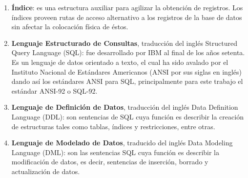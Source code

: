 \begin{enumerate}
	\item \textbf{Índice}: es una estructura auxiliar para agilizar la obtención de registros. Los índices proveen rutas de acceso alternativo a los registros de la base de datos sin afectar la colocación física de éstos\cite{FundamentalsOfDBSystems}.
	\item \textbf{Lenguaje Estructurado de Consultas}, traducción del inglés Structured Query Language (SQL): fue desarrollado por IBM\textsuperscript{\textcopyright} al final de los años setenta. Es un lenguaje de datos orientado a texto, el cual ha sido avalado por el Instituto Nacional de Estándares Americanos (ANSI por sus siglas en inglés) dando así los estándares ANSI para SQL, principalmente para este trabajo el estándar ANSI-92 o SQL-92.
	\item \textbf{Lenguaje de Definición de Datos}, traducción del inglés Data Definition Language (DDL): son sentencias de SQL cuya función es describir la creación de estructuras tales como tablas, índices y restricciones, entre otras\cite{DataBaseConcepts}.
	\item \textbf{Lenguaje de Modelado de Datos}, traducido del inglés Data Modeling Language (DML): son las sentencias SQL cuya función es describir la modificación de datos, es decir, sentencias de inserción, borrado y actualización de datos\cite{DataBaseConcepts}.  
\end{enumerate}

